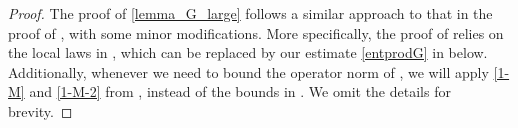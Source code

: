 \documentclass[10pt,reqno]{amsart}
\numberwithin{equation}{section}
\numberwithin{figure}{section}
\theoremstyle{plain} %
\theoremstyle{definition} %
\newtheorem{remark}[theorem]{Remark}
\newcommand{\wh}{\widehat}
\newcommand{\p}[1]{({#1})}
\newcommand{\pa}[1]{\left({#1}\right)}
\newcommand{\norm}[1]{\lVert #1 \rVert}
\newcommand{\norma}[1]{\left\lVert #1 \right\rVert}
\newcommand{\avga}[1]{\left\langle #1 \right\rangle}
\DeclareMathOperator{\im}{\mathrm{Im}}
\newcommand{\opr}[1]{\mathrm{O}_\prec\left({#1}\right)}
\numberwithin{equation}{section}
\begin{document}
\begin{proof}
    The proof of \cref{lemma_G_large} follows a similar approach to that in the proof of \cite[Lemma 4.2]{stone2024randommatrixmodelquantum}, with some minor modifications.
    More specifically, the proof of \cite[Lemma 4.2]{stone2024randommatrixmodelquantum} relies on the local laws in \cite[Lemma 2.11]{stone2024randommatrixmodelquantum}, which can be replaced by our estimate \eqref{entprodG} in  below. Additionally, whenever we need to bound the operator norm of \smash{$\p{1-\wh M_{\pa{1,2}}}^{-1}$}, we will apply \eqref{1-M} and \eqref{1-M-2} from , instead of the bounds in  \cite[Lemma A.1]{stone2024randommatrixmodelquantum}. 
    We omit the details for brevity.
\end{proof}

\end{document}
